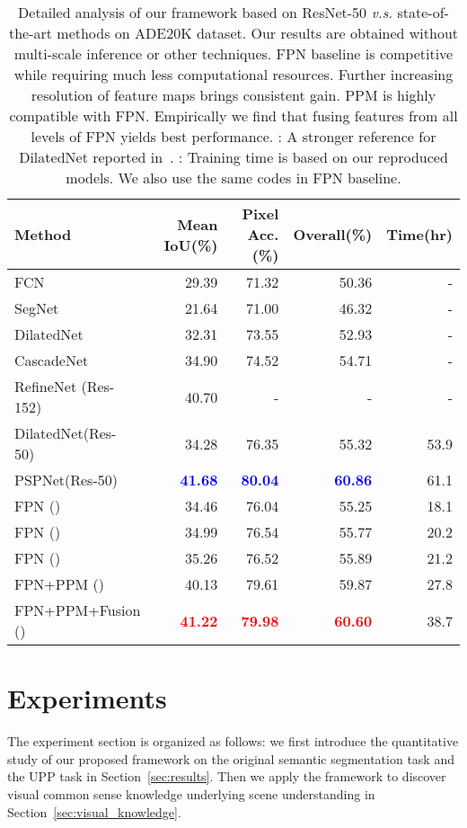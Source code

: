 \documentclass[runningheads]{llncs}
\begin{document}
\begin{table}[!tbp]
\begin{center}
\setlength{\tabcolsep}{5.8pt}
\begin{tabular}{l r r r | r}
\toprule[0.8pt]
Method & Mean IoU(\%) & Pixel Acc.(\%) & Overall(\%) & Time(hr) \\
\hline
FCN~\cite{long2015fully} & 29.39 & 71.32 & 50.36 & - \\
SegNet~\cite{badrinarayanan2017segnet} & 21.64 & 71.00 & 46.32 & - \\
DilatedNet~\cite{yu2015multi} & 32.31 & 73.55 & 52.93 & - \\
CascadeNet~\cite{zhou2017scene} & 34.90 & 74.52 & 54.71 & - \\
RefineNet (Res-152)~\cite{lin2017refinenet} & 40.70 & - & - & - \\
DilatedNet(Res-50)~\cite{zhao2017pyramid} & 34.28 & 76.35 & 55.32 & 53.9 \\
PSPNet(Res-50)~\cite{zhao2017pyramid} & \textcolor{blue}{\textbf{41.68}} & \textcolor{blue}{\textbf{80.04}} & \textcolor{blue}{\textbf{60.86}} & 61.1 \\
\hline
FPN () & 34.46 & 76.04 & 55.25 & 18.1 \\
FPN () & 34.99 & 76.54 & 55.77 & 20.2 \\
FPN () & 35.26 & 76.52 & 55.89 & 21.2 \\
FPN+PPM () & 40.13 & 79.61 & 59.87 & 27.8 \\
FPN+PPM+Fusion () & \textcolor{red}{\textbf{41.22}} & \textcolor{red}{\textbf{79.98}} & \textcolor{red}{\textbf{60.60}} & 38.7 \\
\bottomrule[0.8pt]
\end{tabular}
\end{center}
\caption{Detailed analysis of our framework based on ResNet-50 \emph{v.s.} state-of-the-art methods on ADE20K dataset. Our results are obtained without multi-scale inference or other techniques. FPN baseline is competitive while requiring much less computational resources. Further increasing resolution of feature maps brings consistent gain. PPM is highly compatible with FPN. Empirically we find that fusing features from all levels of FPN yields best performance. : A stronger reference for DilatedNet reported in~\cite{zhao2017pyramid}. : Training time is based on our reproduced models. We also use the same codes in FPN baseline.}
\label{tab:framework_on_ade}
\end{table}


\section{Experiments}
The experiment section is organized as follows: we first introduce the quantitative study of our proposed framework on the original semantic segmentation task and the UPP task in Section~\ref{sec:results}. Then we apply the framework to discover visual common sense knowledge underlying scene understanding in Section~\ref{sec:visual_knowledge}. 
\end{document}
